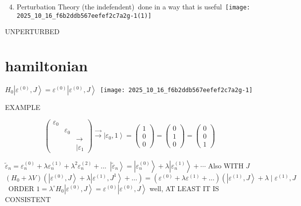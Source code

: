 
\begin{enumerate}
  \setcounter{enumi}{3} 
  \item Perturbation Theory (the indefendent)\
done in a way that is useful\
\texttt{[image: 2025\_10\_16\_f6b2ddb567eefef2c7a2g-1(1)]}
\end{enumerate}

UNPERTURBED

\section*{hamiltonian}
$H_{0}\left|\varepsilon^{(0)}, J\right\rangle=\varepsilon^{(0)}\left|\varepsilon^{(0)}, J\right\rangle$\
\texttt{[image: 2025\_10\_16\_f6b2ddb567eefef2c7a2g-1]}

EXAMPLE

$$
\left(\begin{array}{rll}
\varepsilon_{0} & & \\
& \varepsilon_{0} & \\
& & \rightarrow \\
& & \mid \varepsilon_{1}
\end{array}\right) \xrightarrow{\rightarrow}\left|\varepsilon_{0}, 1\right\rangle=\left(\begin{array}{l}
1 \\ 0 \\ 0
\end{array}\right)=\left(\begin{array}{l}
0 \\ 1 \\ 0
\end{array}\right)=\left(\begin{array}{l}
0 \\ 0 \\ 1
\end{array}\right)
$$

$\widetilde{\varepsilon}_{n}=\varepsilon_{n}^{(0)}+\lambda \varepsilon_{n}^{(1)}+\lambda^{2} \varepsilon_{n}^{(2)}+...$\
$\left|\tilde{\varepsilon}_{n}\right\rangle=\left|\varepsilon_{n}^{(0)}\right\rangle+\lambda\left|\varepsilon_{n}^{(1)}\right\rangle+\cdots$ Also WITH $J$
$\left(H_{0}+\lambda V\right)\left(\left|\varepsilon^{(0)}, J\right\rangle+\lambda\left|\varepsilon^{(1)}, J^{1}\right\rangle+\ldots\right)=\left(\varepsilon^{(0)}+\lambda \varepsilon^{(1)}+\ldots\right)\left(\left|\varepsilon^{(1)}, J\right\rangle+\lambda \mid \varepsilon^{(1)}, J\right.$\
ORDER $1=\lambda^{\circ}$\n$H_{0}\left|\varepsilon^{(0)}, J\right\rangle=\varepsilon^{(0)}\left|\varepsilon^{(0)}, J\right\rangle$ well, AT LEAST IT IS CONSISTENT


